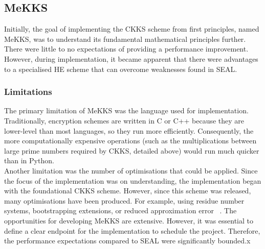 \setlength{\leftskip}{0cm}

\subsection{MeKKS}
\label{sec:mekks}
\setlength{\leftskip}{0.5cm}
\indent \indent
Initially, the goal of implementing the CKKS scheme from first principles, named MeKKS, was to understand its fundamental mathematical principles further. There were little to no expectations of providing a performance improvement. However, during implementation, it became apparent that there were advantages to a specialised HE scheme that can overcome weaknesses found in SEAL.

\setlength{\leftskip}{0cm}
\subsubsection{Limitations}
\label{sec:mekksLimitations}
\setlength{\leftskip}{0.5cm}
\indent \indent
The primary limitation of MeKKS was the language used for implementation. Traditionally, encryption schemes are written in C or C++ because they are lower-level than most languages, so they run more efficiently. Consequently, the more computationally expensive operations (such as the multiplications between large prime numbers required by CKKS, detailed above) would run much quicker than in Python. 
\smallskip \\ \indent
Another limitation was the number of optimisations that could be applied. Since the focus of the implementation was on understanding, the implementation began with the foundational CKKS scheme. However, since this scheme was released, many optimisations have been produced. For example, using residue number systems, bootstrapping extensions, or reduced approximation error ~\cite{RNS, BootstrappingHEAAN, RAE}. The opportunities for developing MeKKS are extensive. However, it was essential to define a clear endpoint for the implementation to schedule the project. Therefore, the performance expectations compared to SEAL were significantly bounded.x

\setlength{\leftskip}{0cm}
